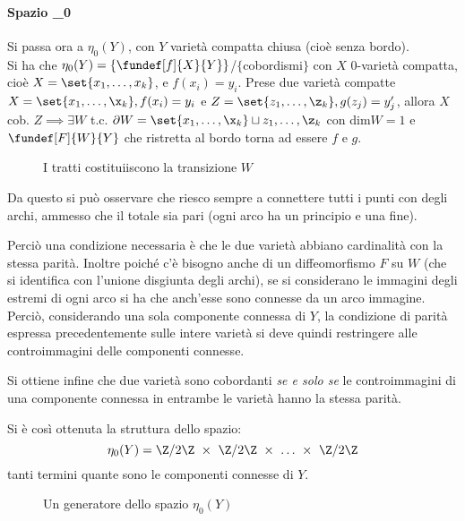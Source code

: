 \paragraph{Spazio \eta_0}
Si passa ora a $\eta_0(Y)$, con $Y$ varietà compatta chiusa (cioè senza bordo). \\
Si ha che $\eta_0(Y) = \{\fundef[f]{X}{Y}\}$/$\{$cobordismi$\}$ con $X$ 0-varietà compatta, cioè $X = \set{x_1, \dots, x_k}$, e $f(x_i) = y_i$.
Prese due varietà compatte $X = \set{x_1, \dots, \x_k}, f(x_i) = y_i$ e $Z = \set{z_1, \dots, \z_k}, g(z_j) = y'_j$, allora $X$ cob. $Z \implies \exists W$ t.c. $\partial W = \set{x_1, \dots, \x_k}\sqcup{z_1, \dots, \z_k}$ con dim$W = 1$ e $\fundef[F]{W}{Y}$ che ristretta al bordo torna ad essere $f$ e $g$.
\begin{es}

\begin{figure}[h]
\centering

\caption{I tratti costituiiscono la transizione $W$}
\end{figure}
Da questo si può osservare che riesco sempre a connettere tutti i punti con degli archi, ammesso che il totale sia pari (ogni arco ha un principio e una fine).
\end{es}
Perciò una condizione necessaria è che le due varietà abbiano cardinalità con la stessa parità. Inoltre poiché c'è bisogno anche di un diffeomorfismo $F$ su $W$ (che si identifica con l'unione disgiunta degli archi), se si considerano le immagini degli estremi di ogni arco si ha che anch'esse sono connesse da un arco immagine. Perciò, considerando una sola componente connessa di $Y$, la condizione di parità espressa precedentemente sulle intere varietà si deve quindi restringere alle controimmagini delle componenti connesse.

Si ottiene infine che due varietà sono cobordanti \emph{se e solo se} le controimmagini di una componente connessa in entrambe le varietà hanno la stessa parità.

Si è così ottenuta la struttura dello spazio: 
\begin{equation*}
\eta_0(Y) = \Z/2\Z~\times~\Z/2\Z~\times~\dots~\times~\Z/2\Z
\end{equation*}
tanti termini quante sono le componenti connesse di $Y$.

\begin{figure}[h]
\centering

\caption{Un generatore dello spazio $\eta_0(Y)$}
\end{figure}

